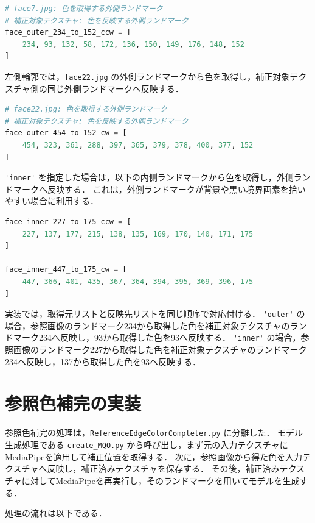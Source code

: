 \documentclass[uplatex,dvipdfmx]{jsarticle}
\begin{document}
\begin{lstlisting}[language=Python]
# face7.jpg: 色を取得する外側ランドマーク
# 補正対象テクスチャ: 色を反映する外側ランドマーク
face_outer_234_to_152_ccw = [
    234, 93, 132, 58, 172, 136, 150, 149, 176, 148, 152
]
\end{lstlisting}

左側輪郭では，\verb|face22.jpg| の外側ランドマークから色を取得し，補正対象テクスチャ側の同じ外側ランドマークへ反映する．

\begin{lstlisting}[language=Python]
# face22.jpg: 色を取得する外側ランドマーク
# 補正対象テクスチャ: 色を反映する外側ランドマーク
face_outer_454_to_152_cw = [
    454, 323, 361, 288, 397, 365, 379, 378, 400, 377, 152
]
\end{lstlisting}

\verb|'inner'| を指定した場合は，以下の内側ランドマークから色を取得し，外側ランドマークへ反映する．
これは，外側ランドマークが背景や黒い境界画素を拾いやすい場合に利用する．

\begin{lstlisting}[language=Python]
face_inner_227_to_175_ccw = [
    227, 137, 177, 215, 138, 135, 169, 170, 140, 171, 175
]

face_inner_447_to_175_cw = [
    447, 366, 401, 435, 367, 364, 394, 395, 369, 396, 175
]
\end{lstlisting}

実装では，取得元リストと反映先リストを同じ順序で対応付ける．
\verb|'outer'| の場合，参照画像のランドマーク234から取得した色を補正対象テクスチャのランドマーク234へ反映し，93から取得した色を93へ反映する．
\verb|'inner'| の場合，参照画像のランドマーク227から取得した色を補正対象テクスチャのランドマーク234へ反映し，137から取得した色を93へ反映する．

\section{参照色補完の実装}

参照色補完の処理は，\verb|ReferenceEdgeColorCompleter.py| に分離した．
モデル生成処理である \verb|create_MQO.py| から呼び出し，まず元の入力テクスチャにMediaPipeを適用して補正位置を取得する．
次に，参照画像から得た色を入力テクスチャへ反映し，補正済みテクスチャを保存する．
その後，補正済みテクスチャに対してMediaPipeを再実行し，そのランドマークを用いてモデルを生成する．

処理の流れは以下である．
\end{document}
